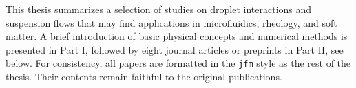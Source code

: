 %
\begin{preface}
	This thesis summarizes a selection of studies on droplet interactions and suspension flows
        that may find applications in microfluidics, rheology, and soft matter.
        A brief introduction of basic physical concepts and numerical methods is presented in Part I,
        followed by eight journal articles or preprints in Part II, see below.
        For consistency, all papers are formatted in the \texttt{jfm} style as the rest of the thesis.
        Their contents remain faithful to the original publications.
\end{preface}


%
